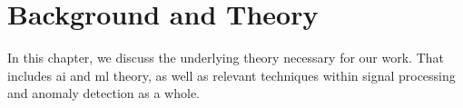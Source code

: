 \chapter{Background and Theory}
\label{chap:back}

In this chapter, we discuss the underlying theory necessary for our work. That includes \acrshort{ai} and \acrshort{ml} theory, as well as relevant techniques within signal processing and anomaly detection as a whole. \\








